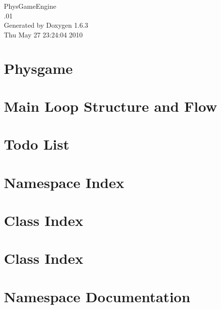 \documentclass[a4paper]{book}
\begin{document}
\hypersetup{pageanchor=false}
\begin{titlepage}
\vspace*{7cm}
\begin{center}
{\Large PhysGameEngine \\[1ex]\large .01 }\\
\vspace*{1cm}
{\large Generated by Doxygen 1.6.3}\\
\vspace*{0.5cm}
{\small Thu May 27 23:24:04 2010}\\
\end{center}
\end{titlepage}
\clearemptydoublepage
{}
\tableofcontents
\clearemptydoublepage
{}
\hypersetup{pageanchor=true}
\chapter{Physgame}
\label{index}\hypertarget{index}{}
\chapter{Main Loop Structure and Flow}
\label{mainloop1}
\hypertarget{mainloop1}{}

\chapter{Todo List}
\label{todo}
\hypertarget{todo}{}

\chapter{Namespace Index}

\chapter{Class Index}

\chapter{Class Index}

\chapter{Namespace Documentation}




\end{document}

